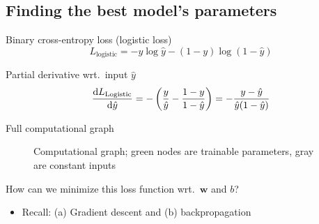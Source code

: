 \documentclass[12pt,aspectratio=169,handout]{beamer}
\begin{document}
\subsection{Finding the best model's parameters}



\begin{frame}{Binary cross-entropy loss (logistic loss)}
$$
L_{\text{logistic}} = - y \log \hat{y} - (1 - y) \log (1 - \hat{y})
$$

\begin{block}{Partial derivative wrt.\ input $\hat{y}$}
$$
\dv{L_{\text{Logistic}}}{\hat{y}} =
- \left(
\frac{y}{\hat{y}} - \frac{1 - y}{1 - \hat{y}}
\right)
=
- \frac{y - \hat{y}}{ \hat{y} (1 - \hat{y})}
$$
\end{block}

\end{frame}

\begin{frame}{Full computational graph}
\begin{figure}
	\caption{Computational graph; green nodes are trainable parameters, gray are constant inputs}
\end{figure}

How can we minimize this loss function wrt.\ $\bm{w}$ and $b$?

\pause
\begin{itemize}
	\item Recall: (a) Gradient descent and (b) backpropagation
\end{itemize}

\end{frame}
\end{document}
